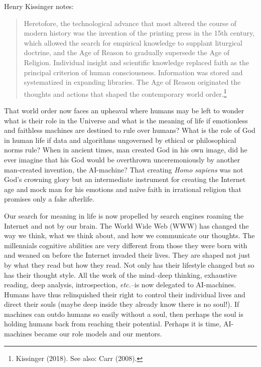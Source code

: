 \begin{multicols}{2}
Henry Kissinger notes:
\begin{quote}
Heretofore, the technological advance that most altered the course of modern history was the invention of the printing press in the 15th century, which allowed the search for empirical knowledge to supplant liturgical doctrine, and the Age of Reason to gradually supersede the Age of Religion. Individual insight and scientific knowledge replaced faith as the principal criterion of human consciousness. Information was stored and systematized in expanding libraries. The Age of Reason originated the thoughts and actions that shaped the contemporary world order.\footnote{Kissinger (2018). See also: Carr (2008).}
\end{quote}

That world order now faces an upheaval where humans may be left to wonder what is their role in the Universe and what is the meaning of life if emotionless and faithless machines are destined to rule over humans? What is the role of God in human life if data and algorithms ungoverned by ethical or philosophical norms rule? When in ancient times, man created God in his own image, did he ever imagine that his God would be overthrown unceremoniously by another man-created invention, the AI-machine? That creating \textit{Homo sapiens} was not God's crowning glory but an intermediate
instrument for creating the Internet age and mock man for his emotions and naïve faith in irrational religion that promises only a fake afterlife.

Our search for meaning in life is now propelled by search engines roaming the Internet and not by our brain. The World Wide Web (WWW) has changed the way we think, what we think about, and how we communicate our thoughts. The millennials cognitive abilities are very different from those they were born with and weaned on before the Internet invaded their lives. They are shaped not just by what they read but how they read. Not only has their lifestyle changed but so has their thought style. All the work of the mind--deep thinking, exhaustive reading, deep analysis, introspection, \textit{etc.}--is now delegated to AI-machines. Humans have thus relinquished their right to control their individual lives and direct their souls (maybe deep inside they already know there is no soul!). If machines can outdo humans so easily without a soul, then perhaps the soul is holding humans back from reaching their potential. Perhaps it is time, AI-machines became our role models and our mentors.


\end{multicols}
